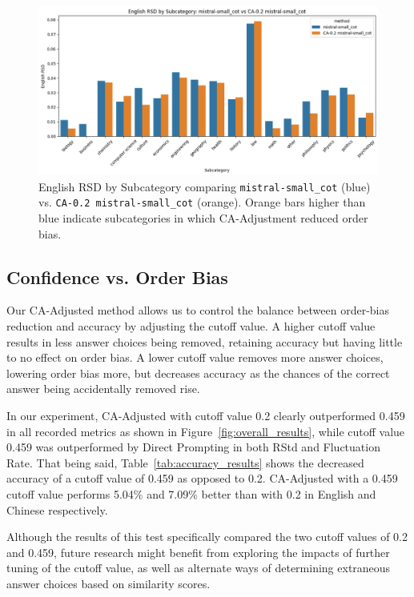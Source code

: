 \begin{figure}[t]
    \centering
    \includegraphics[width=\textwidth]{figures/subcategory.png}
    \caption{English RSD by Subcategory comparing \texttt{mistral-small\_cot} (blue) vs. \texttt{CA-0.2 mistral-small\_cot} (orange). Orange bars higher than blue indicate subcategories in which CA-Adjustment reduced order bias.}
    \label{fig:subcategory_rsd}
\end{figure}


\subsection{Confidence vs. Order Bias}

Our CA-Adjusted method allows us to control the balance between order-bias reduction and accuracy by adjusting the cutoff value. A higher cutoff value results in less answer choices being removed, retaining accuracy but having little to no effect on order bias. A lower cutoff value removes more answer choices, lowering order bias more, but decreases accuracy as the chances of the correct answer being accidentally removed rise.

In our experiment, CA-Adjusted with cutoff value 0.2 clearly outperformed 0.459 in all recorded metrics as shown in Figure~\ref{fig:overall_results}, while cutoff value 0.459 was outperformed by Direct Prompting in both RStd and Fluctuation Rate. That being said, Table~\ref{tab:accuracy_results} shows the decreased accuracy of a cutoff value of 0.459 as opposed to 0.2. CA-Adjusted with a 0.459 cutoff value performs 5.04\% and 7.09\% better than with 0.2 in English and Chinese respectively.

Although the results of this test specifically compared the two cutoff values of 0.2 and 0.459, future research might benefit from exploring the impacts of further tuning of the cutoff value, as well as alternate ways of determining extraneous answer choices based on similarity scores.

